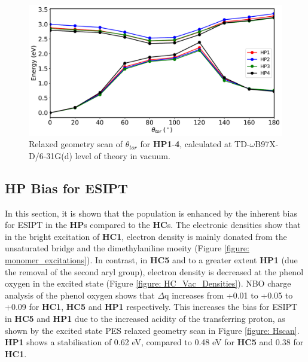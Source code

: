 \begin{figure}[t]
\centering
  \includegraphics[width=0.9\linewidth]{5ConnectingCrystalStructure/2HP_scan_vac.pdf}
  \caption[Relaxed geometry scan of $\theta_{tor}$ for \textbf{HP} derivatives]{Relaxed geometry scan of $\theta_{tor}$ for \textbf{HP1}-\textbf{4}, calculated at TD-$\omega$B97X-D/6-31G(d) level of theory in vacuum.}
  \label{figure: HP_scan_vac}
\end{figure}
\subsection{\textbf{HP} Bias for ESIPT}\label{section: Connecting_Bias}
In this section, it is shown that the \Kstar{} population is enhanced by the inherent bias for ESIPT in the \textbf{HP}s compared to the \textbf{HC}s. The electronic densities show that in the bright excitation of \textbf{HC1}, electron density is mainly donated from the unsaturated bridge and the dimethylaniline moeity (Figure \ref{figure: monomer_excitations}). In contrast, in \textbf{HC5} and to a greater extent \textbf{HP1} (due the removal of the second aryl group), electron density is decreased at the phenol oxygen in the excited state (Figure \ref{figure: HC_Vac_Densities}). NBO charge analysis of the phenol oxygen shows that $\Delta$q increases from +0.01 to +0.05 to +0.09 for \textbf{HC1}, \textbf{HC5} and \textbf{HP1} respectively. This increases the bias for ESIPT in \textbf{HC5} and \textbf{HP1} due to the increased acidity of the transferring proton, as shown by the excited state PES relaxed geometry scan in Figure \ref{figure: Hscan}. \textbf{HP1} shows a stabilisation of 0.62 eV, compared to 0.48 eV for \textbf{HC5} and 0.38 for \textbf{HC1}. 

